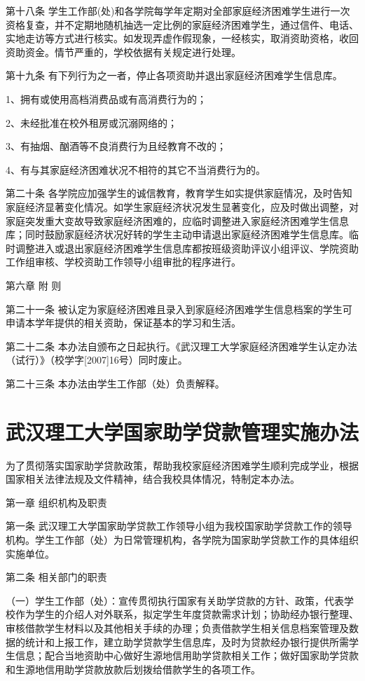 \documentclass[UTF8,12pt,a4paper]{report}
\begin{document}
第十八条 学生工作部(处)和各学院每学年定期对全部家庭经济困难学生进行一次资格复查，并不定期地随机抽选一定比例的家庭经济困难学生，通过信件、电话、实地走访等方式进行核实。如发现弄虚作假现象，一经核实，取消资助资格，收回资助资金。情节严重的，学校依据有关规定进行处理。

第十九条 有下列行为之一者，停止各项资助并退出家庭经济困难学生信息库。

1、拥有或使用高档消费品或有高消费行为的；

2、未经批准在校外租房或沉溺网络的；

3、有抽烟、酗酒等不良消费行为且经教育不改的；

4、有与其家庭经济困难状况不相符的其它不当消费行为的。

第二十条 各学院应加强学生的诚信教育，教育学生如实提供家庭情况，及时告知家庭经济显著变化情况。如学生家庭经济状况发生显著变化，应及时做出调整，对家庭突发重大变故导致家庭经济困难的，应临时调整进入家庭经济困难学生信息库；同时鼓励家庭经济状况好转的学生主动申请退出家庭经济困难学生信息库。临时调整进入或退出家庭经济困难学生信息库都按班级资助评议小组评议、学院资助工作组审核、学校资助工作领导小组审批的程序进行。

第六章 附 则

第二十一条 被认定为家庭经济困难且录入到家庭经济困难学生信息档案的学生可申请本学年提供的相关资助，保证基本的学习和生活。

第二十二条 本办法自颁布之日起执行。《武汉理工大学家庭经济困难学生认定办法（试行）》（校学字[2007]16号）同时废止。

第二十三条 本办法由学生工作部（处）负责解释。

\chapter{武汉理工大学国家助学贷款管理实施办法}
为了贯彻落实国家助学贷款政策，帮助我校家庭经济困难学生顺利完成学业，根据国家相关法律法规及文件精神，结合我校具体情况，特制定本办法。

第一章 组织机构及职责

第一条 武汉理工大学国家助学贷款工作领导小组为我校国家助学贷款工作的领导机构。学生工作部（处）为日常管理机构，各学院为国家助学贷款工作的具体组织实施单位。

第二条 相关部门的职责

（一）学生工作部（处）：宣传贯彻执行国家有关助学贷款的方针、政策，代表学校作为学生的介绍人对外联系，拟定学生年度贷款需求计划；协助经办银行整理、审核借款学生材料以及其他相关手续的办理；负责借款学生相关信息档案管理及数据的统计和上报工作，建立助学贷款学生信息库，及时为贷款经办银行提供所需学生信息；配合当地资助中心做好生源地信用助学贷款相关工作；做好国家助学贷款和生源地信用助学贷款放款后划拨给借款学生的各项工作。
\end{document}
